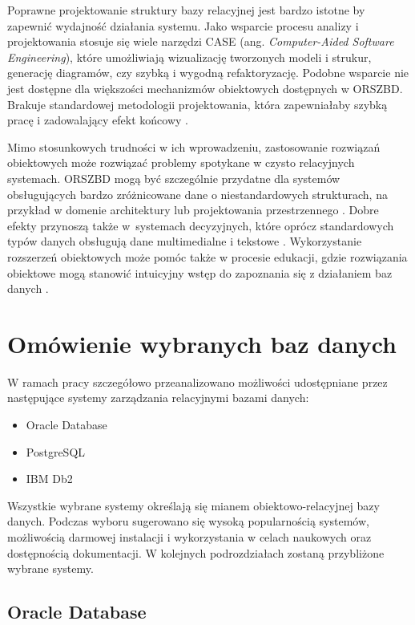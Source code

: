 \documentclass[a4paper,twoside,12pt]{book}
\begin{document}
Poprawne projektowanie struktury bazy relacyjnej jest bardzo istotne by zapewnić wydajność działania systemu. Jako wsparcie procesu analizy i projektowania stosuje się wiele narzędzi CASE (ang. \textit{Computer-Aided Software Engineering}), które umożliwiają wizualizację tworzonych modeli i strukur, generację diagramów, czy szybką i wygodną refaktoryzację. Podobne wsparcie nie jest dostępne dla większości mechanizmów obiektowych dostępnych w ORSZBD. Brakuje standardowej metodologii projektowania, która zapewniałaby szybką pracę i zadowalający efekt końcowy \cite{bib:fundamentals-for-automation-of-ordb-design}.

Mimo stosunkowych trudności w ich wprowadzeniu, zastosowanie rozwiązań obiektowych może rozwiązać problemy spotykane w czysto relacyjnych systemach. ORSZBD mogą być szczególnie przydatne dla systemów obsługujących bardzo zróżnicowane dane o niestandardowych strukturach, na przykład w domenie architektury lub projektowania przestrzennego \cite{bib:OR-IFC-storage-model-based-on-oracle}. Dobre efekty przynoszą także w~systemach decyzyjnych, które oprócz standardowych typów danych obsługują dane multimedialne i tekstowe \cite{bib:integrating-xml-technology-with-or-databases}. Wykorzystanie rozszerzeń obiektowych może pomóc także w procesie edukacji, gdzie rozwiązania obiektowe mogą stanowić intuicyjny wstęp do zapoznania się z działaniem baz danych \cite{bib:solving-relational-DB-problems-with-ORDBMS}.  

\chapter{Omówienie wybranych baz danych}

W ramach pracy szczegółowo przeanalizowano możliwości udostępniane przez następujące systemy zarządzania relacyjnymi bazami danych:
\begin{itemize}
\item Oracle Database
\item PostgreSQL
\item IBM Db2
\end{itemize}

Wszystkie wybrane systemy określają się mianem obiektowo-relacyjnej bazy danych. Podczas wyboru sugerowano się wysoką popularnością systemów, możliwością darmowej instalacji i wykorzystania w celach naukowych oraz dostępnością dokumentacji. W kolejnych podrozdziałach zostaną przybliżone wybrane systemy.

\section{Oracle Database}
\end{document}
